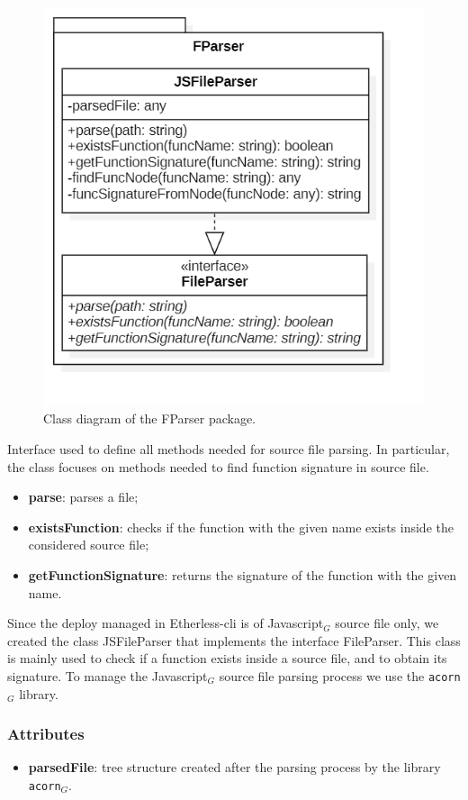 		\begin{figure} [h!]
			\centering
			\includegraphics[width=0.5\linewidth]{diagrammi/etherless-cli/FParser}
			\caption{Class diagram of the FParser package.}
		\end{figure}
		
			Interface used to define all methods needed for source file parsing. In particular, the class focuses on methods needed to find function signature in source file. 
		
					\begin{itemize}
						\item \textbf{parse}: parses a file;   
						\item \textbf{existsFunction}: checks if the function with the given name exists inside the considered source file;
						\item \textbf{getFunctionSignature}: returns the signature of the function with the given name.
					\end{itemize}
		
			Since the deploy managed in Etherless-cli is of Javascript$_{G}$ source file only, we created the class JSFileParser that implements the interface FileParser. This class is mainly used to check if a function exists inside a source file, and to obtain its signature. To manage the Javascript$_{G}$ source file parsing process we use the \texttt{acorn}$_{G}$ library. 
			
				\subsubsection*{Attributes}
					\begin{itemize}
						\item \textbf{parsedFile}: tree structure created after the parsing process by the library \texttt{acorn}$_{G}$.
					\end{itemize}
				
